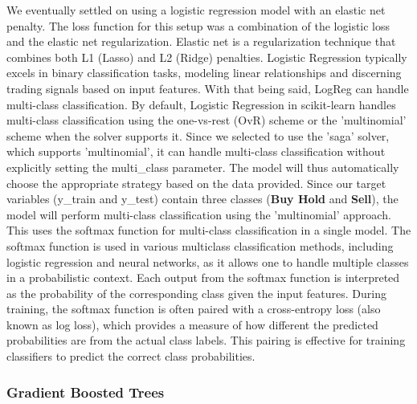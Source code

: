 \documentclass{article}
\begin{document}
We eventually settled on using a logistic regression model with an elastic net penalty. The loss function for this setup was a combination of the logistic loss and the elastic net regularization.
\newline
\newline
Elastic net is a regularization technique that combines both L1 (Lasso) and L2 (Ridge) penalties. 
\newline
\newline
Logistic Regression typically excels in binary classification tasks, modeling linear relationships and discerning trading signals based on input features. With that being said, LogReg can handle multi-class classification.
\newline
\newline
By default, Logistic Regression in scikit-learn handles multi-class classification using the one-vs-rest (OvR) scheme or the 'multinomial' scheme when the solver supports it. Since we selected to use the 'saga' solver, which supports 'multinomial', it can handle multi-class classification without explicitly setting the multi\_class parameter. The model will thus automatically choose the appropriate strategy based on the data provided. Since our target variables (y\_train and y\_test) contain three classes (\textbf{Buy Hold} and \textbf{Sell}), the model will perform multi-class classification using the 'multinomial' approach. This uses the softmax function for multi-class classification in a single model.
\newline
\newline
The softmax function is used in various multiclass classification methods, including logistic regression and neural networks, as it allows one to handle multiple classes in a probabilistic context. Each output from the softmax function is interpreted as the probability of the corresponding class given the input features.
\newline
\newline
During training, the softmax function is often paired with a cross-entropy loss (also known as log loss), which provides a measure of how different the predicted probabilities are from the actual class labels. This pairing is effective for training classifiers to predict the correct class probabilities.

\subsubsection{Gradient Boosted Trees}
\end{document}

